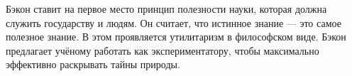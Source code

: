 


Бэкон ставит на первое место принцип полезности науки, которая должна служить государству и людям.
Он считает, что истинное знание --- это самое полезное знание. В этом проявляется утилитаризм в философском виде. Бэкон предлагает учёному работать как экспериментатору, чтобы максимально эффективно раскрывать тайны природы.

